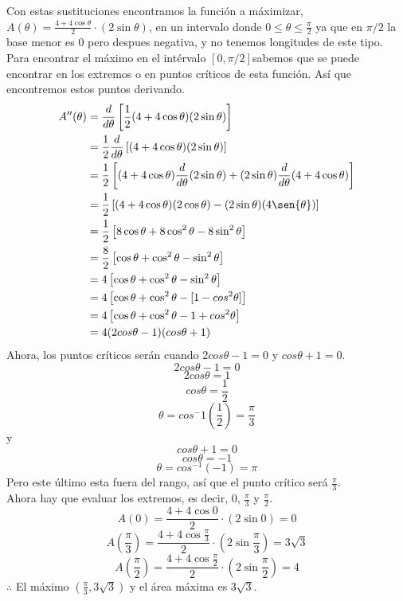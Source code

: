 \documentclass[12pt]{article}
\begin{document}
Con estas sustituciones encontramos la función a máximizar, $A(\theta) = \frac{4+4\cos{\theta}}{2}\cdot( 2\sin{\theta}) $, en un intervalo donde $0 \leq \theta \leq \frac{\pi}{2}$ ya que en $\pi/2$ la base menor es 0 pero despues negativa, y no tenemos longitudes de este tipo.
Para encontrar el máximo en el intérvalo $[0,\pi /2 ]$sabemos que se puede encontrar en los extremos o en puntos críticos de esta función. Así que encontremos estos puntos derivando.
\begin{align*}
  A''(\theta)
  &= \frac{d}{d\theta} \left[  \frac{1}{2}(4+4\cos{\theta})( 2\sin{\theta}) \right]\\
  &= \frac{1}{2}  \frac{d}{d\theta}  \left[ (4+4\cos{\theta})( 2\sin{\theta}) \right]\\
  &= \frac{1}{2}   \left[ (4+4\cos{\theta}) \frac{d}{d\theta}  ( 2\sin{\theta}) + ( 2\sin{\theta}) \frac{d}{d\theta}  (4+4\cos{\theta})  \right]\\
  &= \frac{1}{2}   \left[ (4+4\cos{\theta}) ( 2\cos{\theta}) - ( 2\sin{\theta})  (4\sen{\theta})  \right]\\
  &= \frac{1}{2}   \left[  8\cos{\theta} + 8\cos^{2}\theta   - 8\sin^{2}\theta   \right] \\
  &= \frac{8}{2}   \left[  \cos{\theta} + \cos^{2}\theta   - \sin^{2}\theta   \right] \\
  &= 4   \left[  \cos{\theta} + \cos^{2}\theta   - \sin^{2}\theta   \right] \\
  &= 4   \left[  \cos{\theta} + \cos^{2}\theta   -  [1-cos^{2}\theta]   \right] \\
  &= 4   \left[  \cos{\theta} + \cos^{2}\theta   - 1 + cos^{2}\theta   \right] \\
  &= 4   (2cos\theta-1)(cos\theta+1) \\ 
\end{align*}
Ahora, los puntos críticos serán cuando $2cos\theta-1=0$ y $cos\theta+1=0$.
\[
2cos\theta-1=0 
\]
\[
2cos\theta=1 
\]
\[
cos\theta=\frac{1}{2} 
\]
\[
\theta=cos^-1 \left(\frac{1}{2}  \right) = \frac{\pi}{3}
\]
y
\[
cos\theta+1 =0
\]
\[
cos\theta =-1
\]
\[
\theta =cos^{-1}(-1) = \pi
\]
Pero este último esta fuera del rango, así que el punto crítico será $\frac{\pi}{3}$.\\
Ahora hay que evaluar los extremos, es decir, $0$,  $\frac{\pi}{3}$ y $\frac{\pi}{2}$.\\
\[
A(0)= \frac{4+4\cos{0}}{2}\cdot( 2\sin{0}) = 0
\]
\[
A(\frac{\pi}{3})= \frac{4+4\cos{\frac{\pi}{3}}}{2}\cdot( 2\sin{\frac{\pi}{3}})= 3 \sqrt{3}
\]
\[
A(\frac{\pi}{2})= \frac{4+4\cos{\frac{\pi}{2}}}{2}\cdot( 2\sin{\frac{\pi}{2}}) = 4
\]
$\therefore$ El máximo $(\frac{\pi}{3}, 3 \sqrt{3} )$ y el área máxima es $3 \sqrt{3}$.
\end{document}
